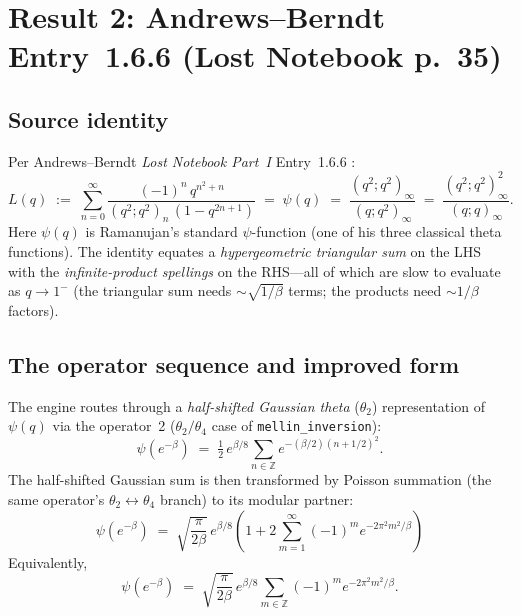 \documentclass[11pt,reqno]{amsart}
\theoremstyle{definition}
\begin{document}
\section{Result 2: Andrews--Berndt Entry~1.6.6 (Lost Notebook p.~35)}\label{sec:result2}

\subsection{Source identity}

Per Andrews--Berndt \emph{Lost Notebook Part~I} Entry~1.6.6
\cite[Lost Notebook p.~35]{AB2005}:
\begin{equation}\label{eq:ab166}
L(q) \;:=\; \sum_{n=0}^\infty \frac{(-1)^n \, q^{n^2 + n}}{(q^2; q^2)_n \, (1 - q^{2n+1})}
\;=\; \psi(q)
\;=\; \frac{(q^2;q^2)_\infty}{(q;q^2)_\infty}
\;=\; \frac{(q^2;q^2)_\infty^2}{(q;q)_\infty}.
\end{equation}
Here $\psi(q)$ is Ramanujan's standard $\psi$-function (one of his
three classical theta functions). The identity equates a
\emph{hypergeometric triangular sum} on the LHS with the
\emph{infinite-product spellings} on the RHS---all of which are slow
to evaluate as $q \to 1^-$ (the triangular sum needs
$\sim \sqrt{1/\beta}$ terms; the products need $\sim 1/\beta$
factors).

\subsection{The operator sequence and improved form}

The engine routes through a \emph{half-shifted Gaussian theta}
($\theta_2$) representation of $\psi(q)$ via the operator~2
($\theta_2/\theta_4$ case of \verb|mellin_inversion|):
\begin{equation}\label{eq:psi-thetashift}
\psi(e^{-\beta}) \;=\; \tfrac{1}{2} \, e^{\beta/8} \sum_{n \in \mathbb{Z}} e^{-(\beta/2)(n + 1/2)^2}.
\end{equation}
The half-shifted Gaussian sum is then transformed by Poisson summation
(the same operator's $\theta_2 \leftrightarrow \theta_4$ branch) to
its modular partner:
\begin{equation}\label{eq:psi-improved}
\boxed{\;\;
\psi(e^{-\beta}) \;=\; \sqrt{\frac{\pi}{2\beta}} \, e^{\beta/8}
   \left( 1 + 2 \sum_{m=1}^\infty (-1)^m e^{-2\pi^2 m^2/\beta} \right)
\;\;}
\end{equation}
Equivalently,
\begin{equation}\label{eq:psi-improved-bilateral}
\psi(e^{-\beta}) \;=\; \sqrt{\frac{\pi}{2\beta}} \, e^{\beta/8} \sum_{m \in \mathbb{Z}} (-1)^m e^{-2\pi^2 m^2/\beta}.
\end{equation}
\end{document}
